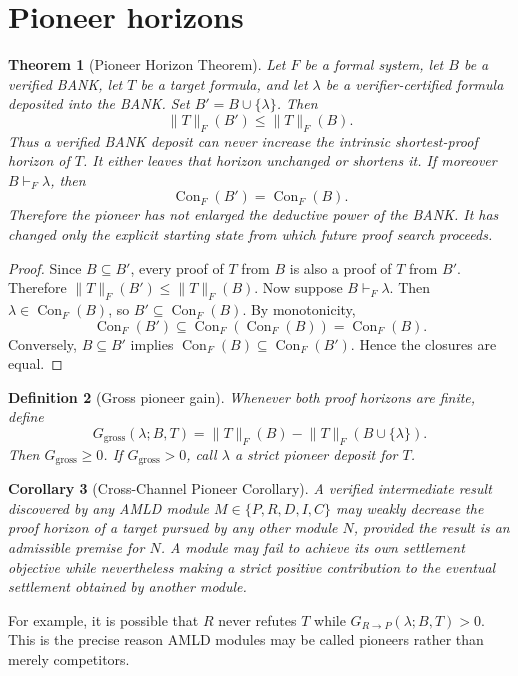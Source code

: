 \documentclass[11pt]{article}
\newtheorem{definition}{Definition}[section]
\newtheorem{theorem}[definition]{Theorem}
\newtheorem{corollary}[definition]{Corollary}
\theoremstyle{remark}
\newcommand{\Con}{\operatorname{Con}}
\begin{document}
\section{Pioneer horizons}
\begin{theorem}[Pioneer Horizon Theorem]
Let $F$ be a formal system, let $B$ be a verified BANK, let $T$ be a target formula, and let $\lambda$ be a verifier-certified formula deposited into the BANK. Set $B'=B\cup\{\lambda\}$. Then
\[
\lVert T\rVert_F(B')\le\lVert T\rVert_F(B).
\]
Thus a verified BANK deposit can never increase the intrinsic shortest-proof horizon of $T$. It either leaves that horizon unchanged or shortens it. If moreover $B\vdash_F\lambda$, then
\[
\Con_F(B')=\Con_F(B).
\]
Therefore the pioneer has not enlarged the deductive power of the BANK. It has changed only the explicit starting state from which future proof search proceeds.
\end{theorem}
\begin{proof}
Since $B\subseteq B'$, every proof of $T$ from $B$ is also a proof of $T$ from $B'$. Therefore $\lVert T\rVert_F(B')\le\lVert T\rVert_F(B)$. Now suppose $B\vdash_F\lambda$. Then $\lambda\in\Con_F(B)$, so $B'\subseteq\Con_F(B)$. By monotonicity,
\[
\Con_F(B')\subseteq\Con_F(\Con_F(B))=\Con_F(B).
\]
Conversely, $B\subseteq B'$ implies $\Con_F(B)\subseteq\Con_F(B')$. Hence the closures are equal.
\end{proof}

\begin{definition}[Gross pioneer gain]
Whenever both proof horizons are finite, define
\[
G_{\mathrm{gross}}(\lambda;B,T)=\lVert T\rVert_F(B)-\lVert T\rVert_F(B\cup\{\lambda\}).
\]
Then $G_{\mathrm{gross}}\ge0$. If $G_{\mathrm{gross}}>0$, call $\lambda$ a strict pioneer deposit for $T$.
\end{definition}

\begin{corollary}[Cross-Channel Pioneer Corollary]
A verified intermediate result discovered by any AMLD module $M\in\{P,R,D,I,C\}$ may weakly decrease the proof horizon of a target pursued by any other module $N$, provided the result is an admissible premise for $N$. A module may fail to achieve its own settlement objective while nevertheless making a strict positive contribution to the eventual settlement obtained by another module.
\end{corollary}
For example, it is possible that $R$ never refutes $T$ while $G_{R\to P}(\lambda;B,T)>0$. This is the precise reason AMLD modules may be called pioneers rather than merely competitors.
\end{document}
